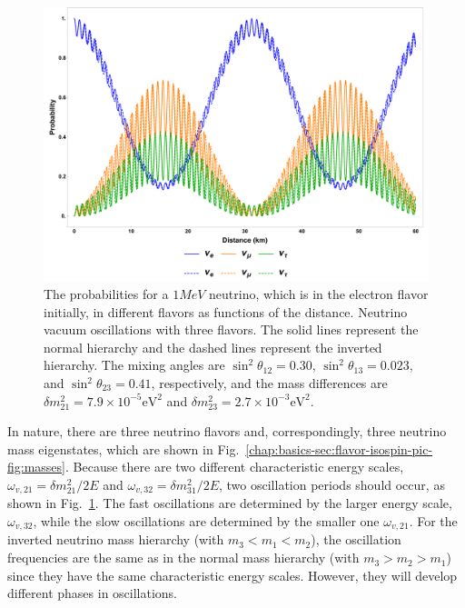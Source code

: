 \begin{figure}
    \centering
    \includegraphics[width=\textwidth]{chapters/assets/basics/vacuum-oscillations-3-flavor.pdf}
    \caption{The probabilities for a $1MeV$ neutrino, which is in the electron flavor initially, in different flavors as functions of the distance. Neutrino vacuum oscillations with three flavors. The solid lines represent the normal hierarchy and the dashed lines represent the inverted hierarchy. The mixing angles are $\sin^2\theta_{12}=0.30$, $\sin^2\theta_{13}=0.023$, and $\sin^2\theta_{23}=0.41$, respectively, and the mass differences are $\delta m_{21}^2 = 7.9\times 10^{-5}\mathrm{eV^2}$ and $\delta m^2_{23}=2.7\times 10^{-3}\mathrm{eV^2}$.}
    \label{chap:basics-section:neutrinos-fig:vacuum-3-flavor-osc}
\end{figure}


In nature, there are three neutrino flavors and, correspondingly, three neutrino mass eigenstates, which are shown in Fig.~\ref{chap:basics-sec:flavor-isospin-pic-fig:masses}. Because there are two different characteristic energy scales, $\omega_{v,21}=\delta m_{21}^2/2E$ and $\omega_{v,32}=\delta m_{31}^2/2E$, two oscillation periods should occur, as shown in Fig.~\ref{chap:basics-section:neutrinos-fig:vacuum-3-flavor-osc}. The fast oscillations are determined by the larger energy scale, $\omega_{v,32}$, while the slow oscillations are determined by the smaller one $\omega_{v,21}$. For the inverted neutrino mass hierarchy (with $m_3 < m_1 < m_2$), the oscillation frequencies are the same as in the normal mass hierarchy (with $m_3>m_2>m_1$) since they have the same characteristic energy scales. However, they will develop different phases in oscillations.



